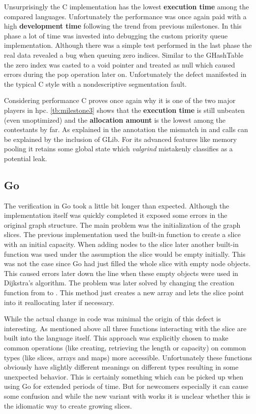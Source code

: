 Unsurprisingly the C implementation has the lowest \textbf{execution time} among the compared languages. Unfortunately the performance was once again paid with a high \textbf{development time} following the trend from previous milestones. In this phase a lot of time was invested into debugging the custom priority queue implementation. Although there was a simple test performed in the last phase the real data revealed a bug when queuing zero indices. Similar to the GHashTable the zero index was casted to a void pointer and treated as null which caused errors during the pop operation later on. Unfortunately the defect manifested in the typical C style with a nondescriptive segmentation fault.

Considering performance C proves once again why it is one of the two major players in \gls{hpc}. \autoref{tb:milestone3} shows that the \textbf{execution time} is still unbeaten (even unoptimized) and the \textbf{allocation amount} is the lowest among the contestants by far. As explained in the annotation the mismatch in  and  calls can be explained by the inclusion of GLib. For its advanced features like memory pooling it retains some global state which \textit{valgrind} mistakenly classifies as a potential leak.

\subsection{Go}
\label{subsec:Implementation::Verification::Go}

The verification in Go took a little bit longer than expected. Although the implementation itself was quickly completed it exposed some errors in the original graph structure. The main problem was the initialization of the graph slices. The previous implementation used the built-in function  to create a slice with an initial capacity. When adding nodes to the slice later another built-in function  was used under the assumption the slice would be empty initially. This was not the case since Go had just filled the whole slice with empty node objects. This caused errors later down the line when these empty objects were used in Dijkstra's algorithm. The problem was later solved by changing the creation function from  to . This method just creates a new array and lets the slice point into it reallocating later if necessary.

While the actual change in code was minimal the origin of this defect is interesting. As mentioned above all three functions interacting with the slice are built into the language itself. This approach was explicitly chosen to make common operations (like creating, retrieving the length or capacity) on common types (like slices, arrays and maps) more accessible. Unfortunately these functions obviously have slightly different meanings on different types resulting in some unexpected behavior. This is certainly something which can be picked up when using Go for extended periods of time. But for newcomers especially it can cause some confusion and while the new variant with  works it is unclear whether this is the idiomatic way to create growing slices.

